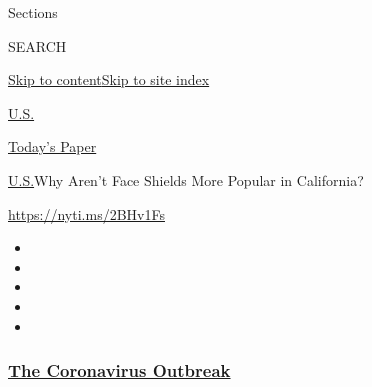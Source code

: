 Sections

SEARCH

\protect\hyperlink{site-content}{Skip to
content}\protect\hyperlink{site-index}{Skip to site index}

\href{https://www.nytimes3xbfgragh.onion/section/us}{U.S.}

\href{https://myaccount.nytimes3xbfgragh.onion/auth/login?response_type=cookie\&client_id=vi}{}

\href{https://www.nytimes3xbfgragh.onion/section/todayspaper}{Today's
Paper}

\href{/section/us}{U.S.}\textbar{}Why Aren't Face Shields More Popular
in California?

\url{https://nyti.ms/2BHv1Fs}

\begin{itemize}
\item
\item
\item
\item
\item
\end{itemize}

\hypertarget{the-coronavirus-outbreak}{%
\subsubsection{\texorpdfstring{\href{https://www.nytimes3xbfgragh.onion/news-event/coronavirus?name=styln-coronavirus-national\&region=TOP_BANNER\&block=storyline_menu_recirc\&action=click\&pgtype=Article\&impression_id=298108e0-f4bd-11ea-9f52-359fb3db6407\&variant=undefined}{The
Coronavirus
Outbreak}}{The Coronavirus Outbreak}}\label{the-coronavirus-outbreak}}

